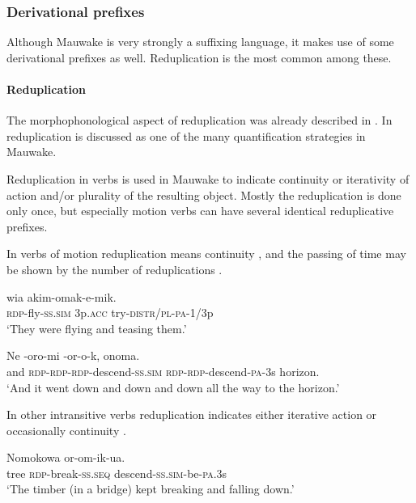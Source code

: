 \subsubsection{Derivational prefixes}
{}
Although Mauwake is very strongly a suffixing language, it makes use of some derivational prefixes as well. Reduplication is the most common among these. 

\paragraph{Reduplication}\label{sec:3.8.2.4.1}
{}
The morphophonological aspect of reduplication was already described in . In  reduplication is discussed as one of the many quantification strategies in Mauwake.

Reduplication in verbs is used in Mauwake to indicate continuity or iterativity of action and/or plurality of the resulting object. Mostly the reduplication is done only once, but especially motion verbs can have several identical reduplicative prefixes. 

In verbs of motion reduplication means continuity , and the passing of time may be shown by the number of reduplications .

\ea%
\label{ex:3:x218}
\gll {} wia akim-omak-e-mik. \\
\textsc{rdp}-fly-\textsc{ss}.\textsc{sim} 3p.\textsc{acc} try-\textsc{distr}/\textsc{pl}-\textsc{pa}-1/3p \\
\glt`They were flying and teasing them.' 
\z

\ea%
\label{ex:3:x216}
\gll Ne -oro-mi -or-o-k, onoma.\\
and \textsc{rdp}-\textsc{rdp}-\textsc{rdp}-descend-\textsc{ss}.\textsc{sim} \textsc{rdp}-\textsc{rdp}-descend-\textsc{pa}-3s horizon.\\
\glt`And it went down and down and down all the way to the horizon.'
\z

In other intransitive verbs reduplication indicates either iterative action  or occasionally continuity .

\ea%
\label{ex:3:x217}
\gll Nomokowa  or-om-ik-ua. \\
tree \textsc{rdp}-break-\textsc{ss}.\textsc{seq} descend-\textsc{ss}.\textsc{sim}-be-\textsc{pa}.3s\\
\glt`The timber (in a bridge) kept breaking and falling down.' 
\z


